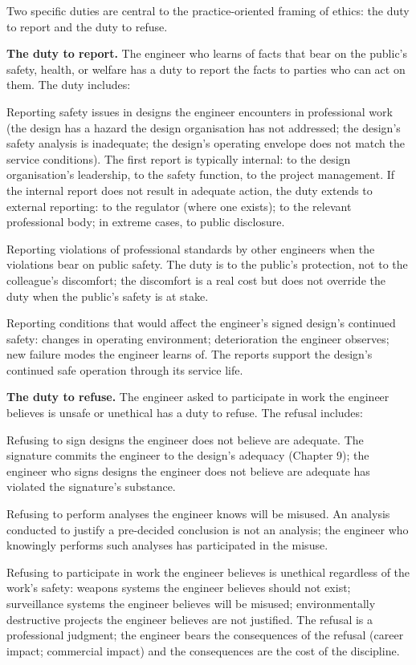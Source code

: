 Two specific duties are central to the practice-oriented framing of ethics: the duty to report and the duty to refuse.

\textbf{The duty to report.} The engineer who learns of facts that bear on the public's safety, health, or welfare has a duty to report the facts to parties who can act on them. The duty includes:

Reporting safety issues in designs the engineer encounters in professional work (the design has a hazard the design organisation has not addressed; the design's safety analysis is inadequate; the design's operating envelope does not match the service conditions). The first report is typically internal: to the design organisation's leadership, to the safety function, to the project management. If the internal report does not result in adequate action, the duty extends to external reporting: to the regulator (where one exists); to the relevant professional body; in extreme cases, to public disclosure.

Reporting violations of professional standards by other engineers when the violations bear on public safety. The duty is to the public's protection, not to the colleague's discomfort; the discomfort is a real cost but does not override the duty when the public's safety is at stake.

Reporting conditions that would affect the engineer's signed design's continued safety: changes in operating environment; deterioration the engineer observes; new failure modes the engineer learns of. The reports support the design's continued safe operation through its service life.

\textbf{The duty to refuse.} The engineer asked to participate in work the engineer believes is unsafe or unethical has a duty to refuse. The refusal includes:

Refusing to sign designs the engineer does not believe are adequate. The signature commits the engineer to the design's adequacy (Chapter 9); the engineer who signs designs the engineer does not believe are adequate has violated the signature's substance.

Refusing to perform analyses the engineer knows will be misused. An analysis conducted to justify a pre-decided conclusion is not an analysis; the engineer who knowingly performs such analyses has participated in the misuse.

Refusing to participate in work the engineer believes is unethical regardless of the work's safety: weapons systems the engineer believes should not exist; surveillance systems the engineer believes will be misused; environmentally destructive projects the engineer believes are not justified. The refusal is a professional judgment; the engineer bears the consequences of the refusal (career impact; commercial impact) and the consequences are the cost of the discipline.

